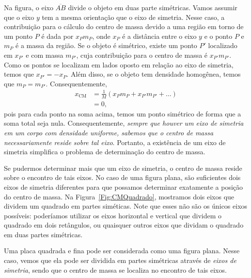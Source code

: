 Na figura, o eixo $\overline{AB}$ divide o objeto em duas parte simétricas. Vamos assumir que o eixo $y$ tem a mesma orientação que o eixo de simetria. Nesse caso, a contribuição para o cálculo do centro de massa devido a uma região em torno de um ponto $P$ é dada por $x_P m_P$, onde $x_P$ é a distância entre o eixo $y$ e o ponto $P$ e $m_P$ é a massa da região. Se o objeto é simétrico, existe um ponto $P'$ localizado em $x_{P'}$ e com massa $m_{P'}$, cuja contribuição para o centro de massa é $x_{P'}m_{P'}$. Como os pontos se localizam em lados oposto em relação ao eixo de simetria, temos que $x_{P'} = - x_P$. Além disso, se o objeto tem densidade homogênea, temos que $m_P = m_{P'}$. Consequentemente,
\begin{align}
  x_\textrm{CM} &= \frac{1}{M} (x_P m_P + x_{P'} m_{P'} + \dots) \\
  &= 0,
\end{align}
%
pois para cada ponto na soma acima, temos um ponto simétrico de forma que a soma total seja nula. Consequentemente, \emph{sempre que houver um eixo de simetria em um corpo com densidade uniforme, sabemos que o centro de massa necessariamente reside sobre tal eixo}. Portanto, a existência de um eixo de simetria simplifica o problema de determinação do centro de massa.

Se pudermos determinar mais que um eixo de simetria, o centro de massa reside sobre o encontro de tais eixos. No caso de uma figura plana, são suficientes dois eixos de simetria diferentes para que possamos determinar exatamente a posição do centro de massa. Na Figura~\ref{Fig:CMQuadrado}, mostramos dois eixos que dividem um quadrado em partes siméticas. Note que esses não são os únicos eixos possíveis: poderíamos utilizar os eixos horizontal e vertical que dividem o quadrado em dois retângulos, ou quaisquer outros eixos que dividam o quadrado em duas partes simétricas.
\begin{marginfigure}
\centering
{}
\caption{Uma placa quadrada e fina pode ser considerada como uma figura plana. Nesse caso, vemos que ela pode ser dividida em partes simétricas através de \emph{eixos de simetria}, sendo que o centro de massa se localiza no encontro de tais eixos. \label{Fig:CMQuadrado}}
\end{marginfigure}


